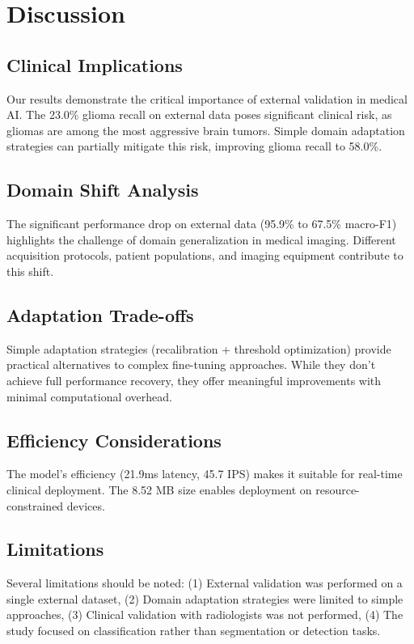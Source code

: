 \documentclass[11pt]{article}
\begin{document}
\section{Discussion}

\subsection{Clinical Implications}

Our results demonstrate the critical importance of external validation in medical AI. The 23.0\% glioma recall on external data poses significant clinical risk, as gliomas are among the most aggressive brain tumors. Simple domain adaptation strategies can partially mitigate this risk, improving glioma recall to 58.0\%.

\subsection{Domain Shift Analysis}

The significant performance drop on external data (95.9\% to 67.5\% macro-F1) highlights the challenge of domain generalization in medical imaging. Different acquisition protocols, patient populations, and imaging equipment contribute to this shift.

\subsection{Adaptation Trade-offs}

Simple adaptation strategies (recalibration + threshold optimization) provide practical alternatives to complex fine-tuning approaches. While they don't achieve full performance recovery, they offer meaningful improvements with minimal computational overhead.

\subsection{Efficiency Considerations}

The model's efficiency (21.9ms latency, 45.7 IPS) makes it suitable for real-time clinical deployment. The 8.52 MB size enables deployment on resource-constrained devices.

\subsection{Limitations}

Several limitations should be noted: (1) External validation was performed on a single external dataset, (2) Domain adaptation strategies were limited to simple approaches, (3) Clinical validation with radiologists was not performed, (4) The study focused on classification rather than segmentation or detection tasks.
\end{document}
